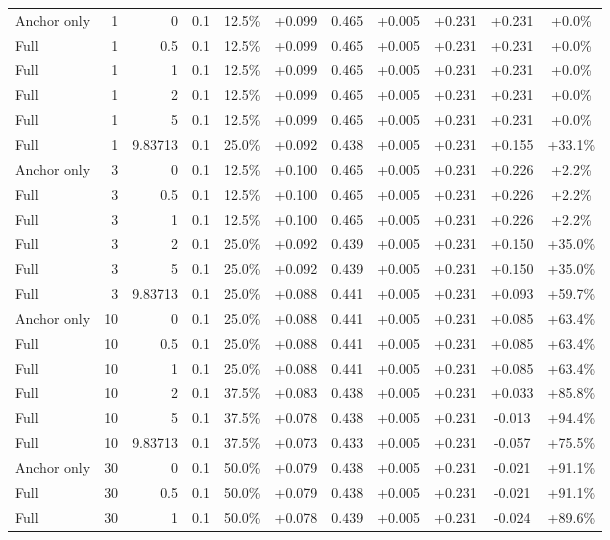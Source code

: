 \begin{table}[htbp]
\begin{tabular}{lrrrccccccc}
Anchor only & 1 & 0 & 0.1 & 12.5\% & +0.099 & 0.465 & +0.005 & +0.231 & +0.231 & +0.0\% \\
Full & 1 & 0.5 & 0.1 & 12.5\% & +0.099 & 0.465 & +0.005 & +0.231 & +0.231 & +0.0\% \\
Full & 1 & 1 & 0.1 & 12.5\% & +0.099 & 0.465 & +0.005 & +0.231 & +0.231 & +0.0\% \\
Full & 1 & 2 & 0.1 & 12.5\% & +0.099 & 0.465 & +0.005 & +0.231 & +0.231 & +0.0\% \\
Full & 1 & 5 & 0.1 & 12.5\% & +0.099 & 0.465 & +0.005 & +0.231 & +0.231 & +0.0\% \\
Full & 1 & 9.83713 & 0.1 & 25.0\% & +0.092 & 0.438 & +0.005 & +0.231 & +0.155 & +33.1\% \\
Anchor only & 3 & 0 & 0.1 & 12.5\% & +0.100 & 0.465 & +0.005 & +0.231 & +0.226 & +2.2\% \\
Full & 3 & 0.5 & 0.1 & 12.5\% & +0.100 & 0.465 & +0.005 & +0.231 & +0.226 & +2.2\% \\
Full & 3 & 1 & 0.1 & 12.5\% & +0.100 & 0.465 & +0.005 & +0.231 & +0.226 & +2.2\% \\
Full & 3 & 2 & 0.1 & 25.0\% & +0.092 & 0.439 & +0.005 & +0.231 & +0.150 & +35.0\% \\
Full & 3 & 5 & 0.1 & 25.0\% & +0.092 & 0.439 & +0.005 & +0.231 & +0.150 & +35.0\% \\
Full & 3 & 9.83713 & 0.1 & 25.0\% & +0.088 & 0.441 & +0.005 & +0.231 & +0.093 & +59.7\% \\
Anchor only & 10 & 0 & 0.1 & 25.0\% & +0.088 & 0.441 & +0.005 & +0.231 & +0.085 & +63.4\% \\
Full & 10 & 0.5 & 0.1 & 25.0\% & +0.088 & 0.441 & +0.005 & +0.231 & +0.085 & +63.4\% \\
Full & 10 & 1 & 0.1 & 25.0\% & +0.088 & 0.441 & +0.005 & +0.231 & +0.085 & +63.4\% \\
Full & 10 & 2 & 0.1 & 37.5\% & +0.083 & 0.438 & +0.005 & +0.231 & +0.033 & +85.8\% \\
Full & 10 & 5 & 0.1 & 37.5\% & +0.078 & 0.438 & +0.005 & +0.231 & -0.013 & +94.4\% \\
Full & 10 & 9.83713 & 0.1 & 37.5\% & +0.073 & 0.433 & +0.005 & +0.231 & -0.057 & +75.5\% \\
Anchor only & 30 & 0 & 0.1 & 50.0\% & +0.079 & 0.438 & +0.005 & +0.231 & -0.021 & +91.1\% \\
Full & 30 & 0.5 & 0.1 & 50.0\% & +0.079 & 0.438 & +0.005 & +0.231 & -0.021 & +91.1\% \\
Full & 30 & 1 & 0.1 & 50.0\% & +0.078 & 0.439 & +0.005 & +0.231 & -0.024 & +89.6\% \\

\end{tabular}
\end{table}
